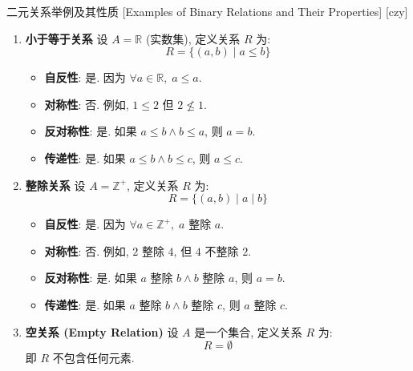 \documentclass[UTF8]{ctexart}
\begin{document}
        \begin{xmp}
            [UUID]
            {二元关系举例及其性质}
            [Examples of Binary Relations and Their Properties]
            [czy]
            \begin{enumerate}
                \item \textbf{小于等于关系}
                    设 \( A = \mathbb{R} \) (实数集), 定义关系 \( R \) 为: 
                    \[
                    R = \{ (a, b) \mid a \leq b \}
                    \]

                    \begin{itemize}
                        \item \textbf{自反性}: 是. 因为 \( \forall a \in \mathbb{R}, \; a \leq a \). 
                        \item \textbf{对称性}: 否. 例如, \( 1 \leq 2 \) 但 \( 2 \nleq 1 \). 
                        \item \textbf{反对称性}: 是. 如果 \( a \leq b \land b \leq a \), 则 \( a = b \). 
                        \item \textbf{传递性}: 是. 如果 \( a \leq b \land b \leq c \), 则 \( a \leq c \). 
                    \end{itemize}
                \item \textbf{整除关系}
                    设 \( A = \mathbb{Z}^+ \), 定义关系 \( R \) 为: 
                    \[
                    R = \{ (a, b) \mid a \mid b \}
                    \]
                    
                    \begin{itemize}
                        \item \textbf{自反性}: 是. 因为 \( \forall a \in \mathbb{Z}^+, \; a \) 整除 \( a \). 
                        \item \textbf{对称性}: 否. 例如, \( 2 \) 整除 \( 4 \), 但 \( 4 \) 不整除 \( 2 \). 
                        \item \textbf{反对称性}: 是. 如果 \( a \) 整除 \( b \land b \) 整除 \( a \), 则 \( a = b \). 
                        \item \textbf{传递性}: 是. 如果 \( a \) 整除 \( b \land b \) 整除 \( c \), 则 \( a \) 整除 \( c \). 
                    \end{itemize}
                \item \textbf{空关系 (Empty Relation)}
                设 \( A \) 是一个集合, 定义关系 \( R \) 为: 
                \[
                R = \emptyset
                \]
                即 \( R \) 不包含任何元素. 
                

\end{enumerate}
\end{xmp}
\end{document}
